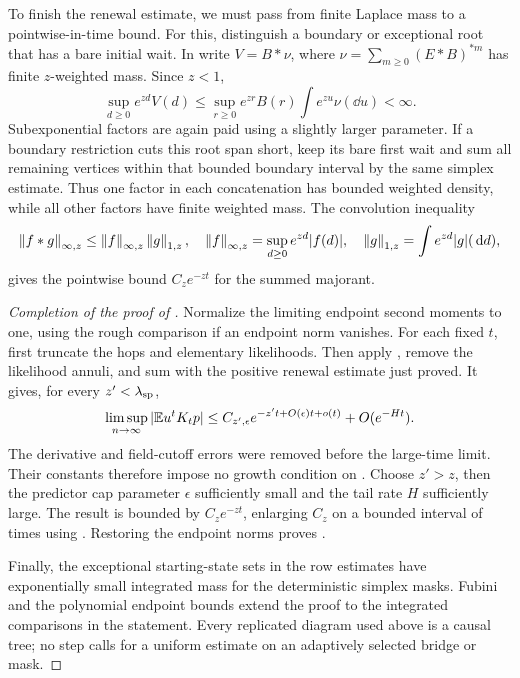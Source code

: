 To finish the renewal estimate, we must pass from finite Laplace
mass to a pointwise-in-time bound. For this, distinguish a boundary
or exceptional root that has a bare initial wait. In 
write $V=B*\nu$, where
$\nu=\sum_{m\geq0}(E*B)^{*m}$ has finite $z$-weighted mass. Since
$z<1$,
\begin{equation}\label{eq:hidden-density-bound}
 \sup_{d\geq0}e^{zd}V(d)
 \leq\sup_{r\geq0}e^{zr}B(r)
                    \int e^{zu}\nu(\dd u)<\infty.
\end{equation}
Subexponential factors are again paid using a slightly larger
parameter. If a boundary restriction cuts this root span short,
keep its bare first wait and sum all remaining vertices within that
bounded boundary interval by the same simplex estimate. Thus one
factor in each concatenation has bounded weighted density, while
all other factors have finite weighted mass. The convolution
inequality
\[
 \left\lVert f*g\right\rVert_{\infty,z}
 \leq\left\lVert f\right\rVert_{\infty,z}\left\lVert g\right\rVert_{1,z},
 \quad
 \left\lVert f\right\rVert_{\infty,z}=\sup_{d\geq0}e^{zd}|f(d)|,
 \quad
 \left\lVert g\right\rVert_{1,z}=\int e^{zd}|g|(\,\mathrm d d),
\]
gives the pointwise bound $C_z e^{-zt}$ for the summed majorant.

\begin{proof}[Completion of the proof of
]
Normalize the limiting endpoint second moments to one, using the
rough comparison if an endpoint norm vanishes. For each fixed $t$,
first truncate the hops and elementary likelihoods. Then apply
, remove the likelihood annuli, and sum
with the positive renewal estimate just proved. It gives, for every
$z'<\lambda_{\rm sp}$,
\[
 \limsup_{n\to\infty}|\mathbb E u^tK_t p|
 \leq C_{z',\epsilon}
       e^{-z't+O(\epsilon)t+o(t)}+O(e^{-Ht}).
\]
The derivative and field-cutoff errors were removed before the
large-time limit. Their constants therefore impose no growth
condition on . Choose $z'>z$, then the predictor
cap parameter $\epsilon$ sufficiently small and the tail rate $H$
sufficiently large. The result is bounded by $C_ze^{-zt}$, enlarging
$C_z$ on a bounded interval of times using
. Restoring the endpoint norms proves
.

Finally, the exceptional starting-state sets in the row estimates
have exponentially small integrated mass for the deterministic
simplex masks. Fubini and the polynomial endpoint bounds extend
the proof to the integrated comparisons in the statement. Every
replicated diagram used above is a causal tree; no step calls for a
uniform estimate on an adaptively selected bridge or mask.
\end{proof}
